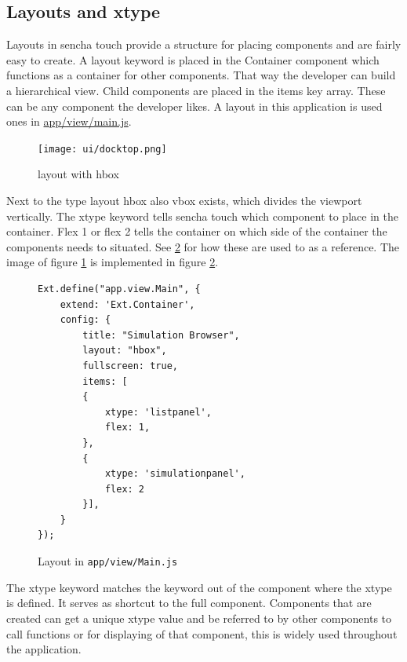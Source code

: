 \subsection{Layouts and xtype}
Layouts in sencha touch provide a structure for placing components and are fairly easy to create. A layout keyword is placed in the Container component which functions as a container for other components. That way the developer can build a hierarchical view. Child components are placed in the items key array. These can be any component the developer likes. A layout in this application is used ones in \url{app/view/main.js}. 

\begin{figure}[H]
\center
\texttt{[image: ui/docktop.png]}
\caption{layout with hbox}
\label{fig:layout}
\end{figure}

Next to the type layout hbox also vbox exists, which divides the viewport vertically.  The xtype keyword tells sencha touch which component to place in the container. Flex 1 or flex 2 tells the container on which side of the container the components needs to situated. See \ref{fig:layout_impl} for how these are used to as a reference. The image of figure \ref{fig:layout} is implemented in figure \ref{fig:layout_impl}.

\begin{figure}[H]
\begin{lstlisting}
Ext.define("app.view.Main", {
    extend: 'Ext.Container',
    config: {
        title: "Simulation Browser",
        layout: "hbox",
        fullscreen: true,
        items: [
        {
            xtype: 'listpanel',
            flex: 1,
        },
        {    
            xtype: 'simulationpanel',
            flex: 2
        }],
    }
});
\end{lstlisting}
\caption{Layout in \texttt{app/view/Main.js}}
\label{fig:layout_impl}
\end{figure}
The xtype keyword matches the keyword out of the component where the xtype is defined. It serves as shortcut to the full component. Components that are created can get a unique xtype value and be referred to by other components to call functions or for displaying  of that component, this is widely used throughout the application.
 

